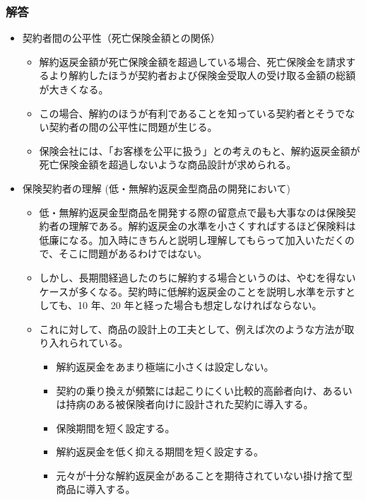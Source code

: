 \documentclass[report,gutter=10mm,fore-edge=10mm]{jlreq}
\begin{document}
\subsubsection{解答}
  \begin{itemize}
    \item 契約者間の公平性（死亡保険金額との関係）
    \begin{itemize}
      \item 解約返戻金額が死亡保険金額を超過している場合、死亡保険金を請求するより解約したほうが契約者および保険金受取人の受け取る金額の総額が大きくなる。
      \item この場合、解約のほうが有利であることを知っている契約者とそうでない契約者の間の公平性に問題が生じる。
      \item 保険会社には、「お客様を公平に扱う」との考えのもと、解約返戻金額が死亡保険金額を超過しないような商品設計が求められる。
    \end{itemize}
    \item 保険契約者の理解 (低・無解約返戻金型商品の開発において)
    \begin{itemize}
      \item 低・無解約返戻金型商品を開発する際の留意点で最も大事なのは保険契約者の理解である。解約返戻金の水準を小さくすればするほど保険料は低廉になる。加入時にきちんと説明し理解してもらって加入いただくので、そこに問題があるわけではない。
      \item しかし、長期間経過したのちに解約する場合というのは、やむを得ないケースが多くなる。契約時に低解約返戻金のことを説明し水準を示すとしても、10 年、20 年と経った場合も想定しなければならない。
      \item これに対して、商品の設計上の工夫として、例えば次のような方法が取り入れられている。
      \begin{itemize}
        \item 解約返戻金をあまり極端に小さくは設定しない。
        \item 契約の乗り換えが頻繁には起こりにくい比較的高齢者向け、あるいは持病のある被保険者向けに設計された契約に導入する。
        \item 保険期間を短く設定する。
        \item 解約返戻金を低く抑える期間を短く設定する。
        \item 元々が十分な解約返戻金があることを期待されていない掛け捨て型商品に導入する。
      \end{itemize}
    \end{itemize}
  \end{itemize}
\end{document}
